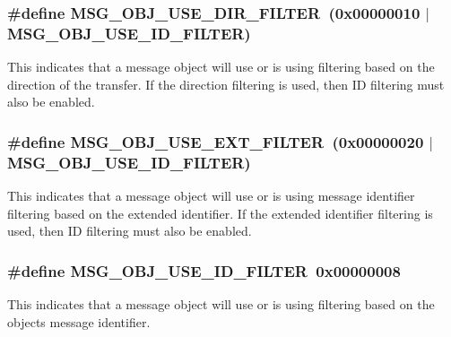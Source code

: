 \subsubsection[{\texorpdfstring{M\+S\+G\+\_\+\+O\+B\+J\+\_\+\+U\+S\+E\+\_\+\+D\+I\+R\+\_\+\+F\+I\+L\+T\+ER}{MSG_OBJ_USE_DIR_FILTER}}]{\setlength{\rightskip}{0pt plus 5cm}\#define M\+S\+G\+\_\+\+O\+B\+J\+\_\+\+U\+S\+E\+\_\+\+D\+I\+R\+\_\+\+F\+I\+L\+T\+ER~(0x00000010 $\vert$ M\+S\+G\+\_\+\+O\+B\+J\+\_\+\+U\+S\+E\+\_\+\+I\+D\+\_\+\+F\+I\+L\+T\+E\+R)}\hypertarget{group__can__api_gabd8bebbc78a6f49c3c3088c5c7d53ca9}{}\label{group__can__api_gabd8bebbc78a6f49c3c3088c5c7d53ca9}
This indicates that a message object will use or is using filtering based on the direction of the transfer. If the direction filtering is used, then ID filtering must also be enabled. 
\subsubsection[{\texorpdfstring{M\+S\+G\+\_\+\+O\+B\+J\+\_\+\+U\+S\+E\+\_\+\+E\+X\+T\+\_\+\+F\+I\+L\+T\+ER}{MSG_OBJ_USE_EXT_FILTER}}]{\setlength{\rightskip}{0pt plus 5cm}\#define M\+S\+G\+\_\+\+O\+B\+J\+\_\+\+U\+S\+E\+\_\+\+E\+X\+T\+\_\+\+F\+I\+L\+T\+ER~(0x00000020 $\vert$ M\+S\+G\+\_\+\+O\+B\+J\+\_\+\+U\+S\+E\+\_\+\+I\+D\+\_\+\+F\+I\+L\+T\+E\+R)}\hypertarget{group__can__api_gacead63b8e758f947f7aecf11d928e490}{}\label{group__can__api_gacead63b8e758f947f7aecf11d928e490}
This indicates that a message object will use or is using message identifier filtering based on the extended identifier. If the extended identifier filtering is used, then ID filtering must also be enabled. 
\subsubsection[{\texorpdfstring{M\+S\+G\+\_\+\+O\+B\+J\+\_\+\+U\+S\+E\+\_\+\+I\+D\+\_\+\+F\+I\+L\+T\+ER}{MSG_OBJ_USE_ID_FILTER}}]{\setlength{\rightskip}{0pt plus 5cm}\#define M\+S\+G\+\_\+\+O\+B\+J\+\_\+\+U\+S\+E\+\_\+\+I\+D\+\_\+\+F\+I\+L\+T\+ER~0x00000008}\hypertarget{group__can__api_gac8b622ceb867ab7de6f285ae630c534a}{}\label{group__can__api_gac8b622ceb867ab7de6f285ae630c534a}
This indicates that a message object will use or is using filtering based on the object\textquotesingle{}s message identifier. 

